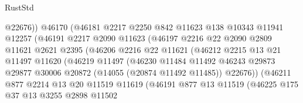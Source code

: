 \begin{lexlean}{RustStd}
\begin{coremodule}
                              @22676))
                          @46170
                          (@46181
                            @2217
                            @2250
                            @842
                            @11623
                            @138
                            @10343
                            @11941
                            @12257
                            (@46191
                              @2217
                              @2090
                              @11623
                              (@46197
                                @2216
                                @22
                                @2090
                                @2809
                                @11621
                                @2621
                                @2395
                                (@46206
                                  @2216
                                  @22
                                  @11621
                                  (@46212
                                    @2215
                                    @13
                                    @21
                                    @11497
                                    @11620
                                    (@46219
                                      @11497
                                      (@46230
                                        @11484
                                        @11492
                                        @46243
                                        @29873
                                        @29877
                                        @30006
                                        @20872
                                        (@14055 (@20874 @11492 @11485))
                                        @22676))
                                    (@46211
                                      @877
                                      @2214
                                      @13
                                      @20
                                      @11519
                                      @11619
                                      (@46191
                                        @877
                                        @13
                                        @11519
                                        (@46225
                                          @175
                                          @37
                                          @13
                                          @3255
                                          @2898
                                          @11502

\end{coremodule}
\end{lexlean}
